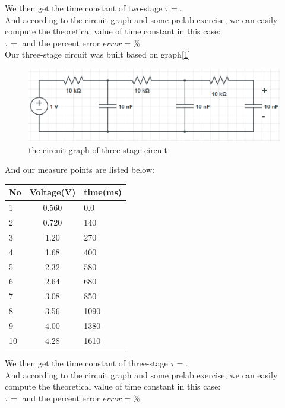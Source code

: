 \phantom{ } We then get the time constant of two-stage 
$\tau = $.\\ And according to the circuit graph and some prelab exercise, we can easily compute
the theoretical value of time constant in this case:\\
$\tau = $ and the percent error $error = \%$.\\
\phantom{ } Our three-stage circuit was built based on graph[\ref{fig:2.4}]\\
\begin{figure}[htbp]
	\centering %
	\includegraphics[width=\linewidth]{images/2_4.PNG} %
	\caption{the circuit graph of three-stage circuit} %
	\label{fig:2.4} %
\end{figure}
\phantom{ } And our measure points are listed below:\\
\begin{table}[htbp]\centering
	\renewcommand\arraystretch{1.5}
	\begin{tabular}{lcl}
		\toprule
		No		&Voltage(V)	&time(ms)	\\
		\midrule
		1		&0.560		&0.0		\\
		
		2		&0.720		&140		\\
		
		3		&1.20		&270		\\
		
		4		&1.68		&400		\\
		
		5		&2.32		&580		\\
		
		6		&2.64		&680		\\
		
		7		&3.08		&850		\\
		
		8		&3.56		&1090		\\
		
		9		&4.00		&1380		\\
		
		10		&4.28		&1610		\\
		\bottomrule
	\end{tabular}
\end{table}
\phantom{ } We then get the time constant of three-stage 
$\tau = $.\\ And according to the circuit graph and some prelab exercise, we can easily compute
the theoretical value of time constant in this case:\\
$\tau = $ and the percent error $error = \%$.\\


